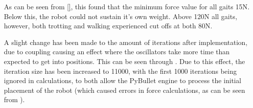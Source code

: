 As can be seen from \ref{}, this found that the minimum force value for all gaits 15N. Below this, the robot could not sustain it's own weight. Above 120N all gaits, however, both trotting and walking experienced cut offs at both 80N.

A slight change has been  made to the amount of iterations after implementation, due to coupling causing an effect where the oscillators take more time than expected to get into positions. This can be seen through \cite{}. Due to this effect, the iteration size has been increased to 11000, with the first 1000 iterations being ignored in calculations, to both allow the PyBullet engine to process the initial placement of the robot (which caused errors in force calculations, as can be seen from \cite{}).












